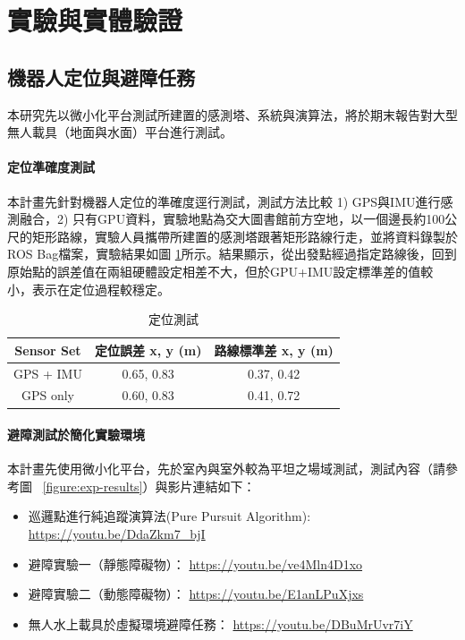 \section{實驗與實體驗證}

\subsection{機器人定位與避障任務}

本研究先以微小化平台測試所建置的感測塔、系統與演算法，將於期末報告對大型無人載具（地面與水面）平台進行測試。

\paragraph{定位準確度測試}

本計畫先針對機器人定位的準確度逕行測試，測試方法比較 1) GPS與IMU進行感測融合，2) 只有GPU資料，實驗地點為交大圖書館前方空地，以一個邊長約100公尺的矩形路線，實驗人員攜帶所建置的感測塔跟著矩形路線行走，並將資料錄製於ROS Bag檔案，實驗結果如圖
\ref{table:loop_closure_error}所示。結果顯示，從出發點經過指定路線後，回到原始點的誤差值在兩組硬體設定相差不大，但於GPU+IMU設定標準差的值較小，表示在定位過程較穩定。

\begin{table}[h]
	\centering
	\begin{tabular}{| c| c| c|}
		\hline
		Sensor Set & 定位誤差  x, y (m) & 路線標準差 x, y (m) \\ \hline
		GPS + IMU & 0.65, 0.83 & 0.37, 0.42 \\ \hline
		GPS only  & 0.60, 0.83 & 0.41, 0.72 \\ \hline 
	\end{tabular}
	\caption{定位測試}
	\label{table:loop_closure_error}
\end{table} 

\paragraph{避障測試於簡化實驗環境} 

本計畫先使用微小化平台，先於室內與室外較為平坦之場域測試，測試內容（請參考圖~ \ref{figure:exp-results}）與影片連結如下：

\begin{itemize}

\item
巡邏點進行純追蹤演算法(Pure Pursuit Algorithm): 
\url{https://youtu.be/DdaZkm7_bjI}

\item
避障實驗一（靜態障礙物）： 
\url{https://youtu.be/ve4Mln4D1xo}

\item
避障實驗二（動態障礙物）：
\url{https://youtu.be/E1anLPuXjxs}

\item
無人水上載具於虛擬環境避障任務： 
\url{https://youtu.be/DBuMrUvr7iY}

\end{itemize}

